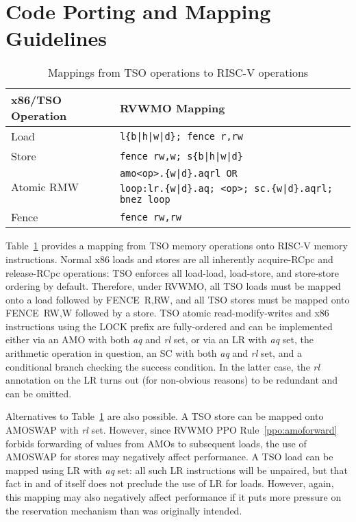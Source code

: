 \section{Code Porting and Mapping Guidelines}
\label{sec:memory:porting}

\begin{table}[h!]
  \centering
  \begin{tabular}{|l|l|}
    \hline
    x86/TSO Operation & RVWMO Mapping \\
    \hline
    \hline
    Load              & \tt l\{b|h|w|d\}; fence r,rw               \\
    \hline
    Store             & \tt fence rw,w; s\{b|h|w|d\}               \\
    \hline
    \multirow{2}{*}{Atomic RMW}
    & \tt amo<op>.\{w|d\}.aqrl \textrm{OR} \\
    & \tt loop:\@ lr.\{w|d\}.aq; <op>; sc.\{w|d\}.aqrl; bnez loop \\
    \hline
    Fence             & \tt fence rw,rw \\
    \hline
  \end{tabular}
  \caption{Mappings from TSO operations to RISC-V operations}
  \label{tab:tsomappings}
\end{table}

Table~\ref{tab:tsomappings} provides a mapping from TSO memory operations onto RISC-V memory instructions.
Normal x86 loads and stores are all inherently acquire-RCpc and release-RCpc operations: TSO enforces all load-load, load-store, and store-store ordering by default.
Therefore, under RVWMO, all TSO loads must be mapped onto a load followed by FENCE~R,RW, and all TSO stores must be mapped onto FENCE~RW,W followed by a store.
TSO atomic read-modify-writes and x86 instructions using the LOCK prefix are fully-ordered and can be implemented either via an AMO with both {\em aq} and {\em rl} set, or via an LR with {\em aq} set, the arithmetic operation in question, an SC with both {\em aq} and {\em rl} set, and a conditional branch checking the success condition.
In the latter case, the {\em rl} annotation on the LR turns out (for non-obvious reasons) to be redundant and can be omitted.

Alternatives to Table~\ref{tab:tsomappings} are also possible.
A TSO store can be mapped onto AMOSWAP with {\em rl} set.
However, since RVWMO PPO Rule~\ref{ppo:amoforward} forbids forwarding of values from AMOs to subsequent loads, the use of AMOSWAP for stores may negatively affect performance.
A TSO load can be mapped using LR with {\em aq} set: all such LR instructions will be unpaired, but that fact in and of itself does not preclude the use of LR for loads.
However, again, this mapping may also negatively affect performance if it puts more pressure on the reservation mechanism than was originally intended.

